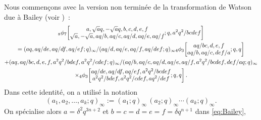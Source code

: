 \documentclass[12pt]{amsart}
\newcommand{\de}{\delta}
\theoremstyle{remark}
\numberwithin{equation}{section}
\begin{document}
Nous commen\c cons avec la version 
non termin{\'e}e de la transformation de Watson due {\`a} Bailey
(voir \cite[(2.10.10); Appendix (III.36)]{gr})~:
\begin{multline} \label{eq:Bailey}
 {} _{8} \phi _{7} \! \left [                \begin{matrix} \let \over /
    \def\frac#1#2{#1 / #2} a, {\sqrt{a}} q, -{\sqrt{a}} q 
    , b, c, d, e, f\\ \let \over / \def\frac#1#2{#1 / #2} {\sqrt{a}},
    -{\sqrt{a}}, \frac{a q}{b}, \frac{a q}{c}, \frac{a q}{d},
    \frac{a q}{e}, \frac{a q}{f}\end{matrix} ;q, {\displaystyle
    \frac{a^ 2 q^ 2}{b c d e f}} \right ] \\=
     \frac {(\let \over / \def\frac#1#2{#1 / #2} a q, \frac{a q}{d e},
      \frac{a q}{d f}, \frac{a q}{e f} ;q) _\infty} {(\let \over /
      \def\frac#1#2{#1 / #2} \frac{a q}{d}, \frac{a q}{e},
      \frac{a q}{f}, \frac{a q}{d e f} ;q) _\infty} 
   {} _{4} \phi _{3} \! \left [                \begin{matrix} \let \over /
      \def\frac#1#2{#1 / #2} \frac{a q}{b c}, d, e, f\\ \let \over /
      \def\frac#1#2{#1 / #2} \frac{a q}{b}, \frac{a q}{c},
      \frac{d e f}{a}\end{matrix} ;q, {\displaystyle q} \right ] \\
 +
\frac {(\let \over / \def\frac#1#2{#1 / #2} a q,
      \frac{a q}{b c}, d, e, f, \frac{a^ 2 q^
      2}{b d e f}, \frac{a^ 2 q^ 2}{c d e f} ;q)
      _\infty} {(\let \over / \def\frac#1#2{#1 / #2} \frac{a q}{b},
      \frac{a q}{c}, \frac{a q}{d}, \frac{a q}{e}, \frac{a q}{f},
      \frac{a^ 2 q^ 2}{b c d e f}, \frac{d e f}{a q}
      ;q) _\infty}\\
\times
    {} _{4} \phi _{3} \! \left [                \begin{matrix} \let \over /
      \def\frac#1#2{#1 / #2} \frac{a q}{d e}, \frac{a q}{d f},
      \frac{a q}{e f}, \frac{a^ 2 q^ 2}{b c d e f}\\
      \let \over / \def\frac#1#2{#1 / #2} \frac{a^ 2 q^
      2}{b d e f}, \frac{a^ 2 q^ 2}{c d e f},
      \frac{a q^ 2}{d e f}\end{matrix} ;q, {\displaystyle q} \right
      ] .
\end{multline}
Dans cette identit{\'e}, on a utilis{\'e} la notation 
$$(a_1,a_2,\dots,a_k;q)_\infty:=(a_1;q)_\infty\,(a_2;q)_\infty\cdots
(a_k;q)_\infty.$$
On sp{\'e}cialise alors $a=\de^2q^{3n+2}$ et 
$b=c=d=e=f=\de q^{n+1}$ dans \eqref{eq:Bailey}, 
\end{document}
